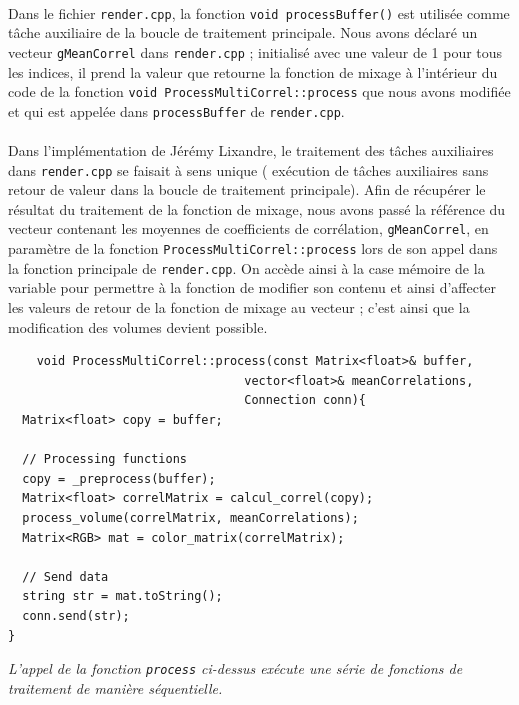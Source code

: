  \paragraph{}
 Dans le fichier \verb!render.cpp!, la fonction
 \verb!void processBuffer()! est utilisée comme tâche auxiliaire de la
 boucle de traitement principale. Nous avons déclaré un vecteur
 \verb!gMeanCorrel! dans \verb!render.cpp! ; initialisé avec une valeur
 de 1 pour tous les indices, il prend la valeur que retourne la
 fonction de mixage à l'intérieur du code de la fonction
 \verb!void ProcessMultiCorrel::process!
 que nous avons modifiée et qui est appelée dans \verb!processBuffer!
 de \verb!render.cpp!.
 \paragraph{}
 Dans l'implémentation de Jérémy Lixandre, le traitement des tâches
 auxiliaires dans \verb!render.cpp! se faisait à sens unique (
 exécution de tâches auxiliaires sans retour de valeur dans la boucle
 de traitement principale). Afin de récupérer le résultat du
 traitement de la fonction de mixage, nous avons passé la référence du
 vecteur contenant les moyennes de coefficients de corrélation,
 \verb!gMeanCorrel!, en paramètre de la fonction
 \verb!ProcessMultiCorrel::process! lors de son appel dans la fonction
 principale de \verb!render.cpp!. On accède ainsi à la case mémoire de
 la variable pour permettre à la fonction de modifier son contenu et
 ainsi d'affecter les valeurs de retour de la fonction de mixage au
 vecteur ; c'est ainsi que la modification des volumes devient
 possible.
 
 \begin{lstlisting}
    void ProcessMultiCorrel::process(const Matrix<float>& buffer,
                                 vector<float>& meanCorrelations,
                                 Connection conn){
  Matrix<float> copy = buffer;

  // Processing functions
  copy = _preprocess(buffer);
  Matrix<float> correlMatrix = calcul_correl(copy);
  process_volume(correlMatrix, meanCorrelations);
  Matrix<RGB> mat = color_matrix(correlMatrix);

  // Send data
  string str = mat.toString();
  conn.send(str);
}
 \end{lstlisting}
 \begin{center}
  \textit{L'appel de la fonction \verb!process! ci-dessus exécute une série de fonctions de traitement de manière séquentielle.}
 \end{center}
 
